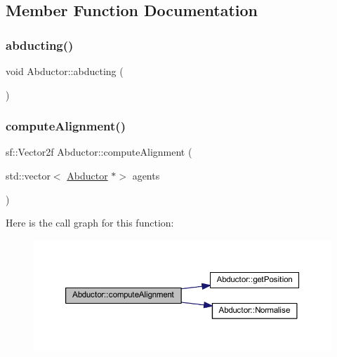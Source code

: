 \subsection{Member Function Documentation}
\mbox{\label{class_abductor_aa790b94b30a6bee13c26ffa4b093af6a}} 
\subsubsection{\texorpdfstring{abducting()}{abducting()}}
{\footnotesize\ttfamily void Abductor\+::abducting (\begin{DoxyParamCaption}{ }\end{DoxyParamCaption})}

\mbox{\label{class_abductor_a1a22ca1f62b22a3e6ab183c0d07215c9}} 
\subsubsection{\texorpdfstring{compute\+Alignment()}{computeAlignment()}}
{\footnotesize\ttfamily sf\+::\+Vector2f Abductor\+::compute\+Alignment (\begin{DoxyParamCaption}\item[{std\+::vector$<$ \hyperlink{class_abductor}{Abductor} $\ast$$>$}]{agents }\end{DoxyParamCaption})}

Here is the call graph for this function\+:
\nopagebreak
\begin{figure}[H]
\begin{center}
\leavevmode
\includegraphics[width=350pt]{class_abductor_a1a22ca1f62b22a3e6ab183c0d07215c9_cgraph}
\end{center}
\end{figure}
\mbox{\label{class_abductor_a8aa45d9b7d770533a60eae180c08d96f}} 
